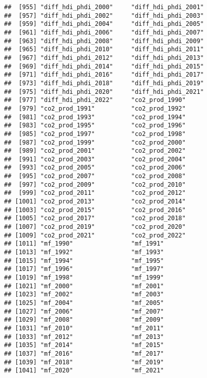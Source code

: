 \documentclass[
]{article}
\begin{document}
\begin{verbatim}
##  [955] "diff_hdi_phdi_2000"     "diff_hdi_phdi_2001"    
##  [957] "diff_hdi_phdi_2002"     "diff_hdi_phdi_2003"    
##  [959] "diff_hdi_phdi_2004"     "diff_hdi_phdi_2005"    
##  [961] "diff_hdi_phdi_2006"     "diff_hdi_phdi_2007"    
##  [963] "diff_hdi_phdi_2008"     "diff_hdi_phdi_2009"    
##  [965] "diff_hdi_phdi_2010"     "diff_hdi_phdi_2011"    
##  [967] "diff_hdi_phdi_2012"     "diff_hdi_phdi_2013"    
##  [969] "diff_hdi_phdi_2014"     "diff_hdi_phdi_2015"    
##  [971] "diff_hdi_phdi_2016"     "diff_hdi_phdi_2017"    
##  [973] "diff_hdi_phdi_2018"     "diff_hdi_phdi_2019"    
##  [975] "diff_hdi_phdi_2020"     "diff_hdi_phdi_2021"    
##  [977] "diff_hdi_phdi_2022"     "co2_prod_1990"         
##  [979] "co2_prod_1991"          "co2_prod_1992"         
##  [981] "co2_prod_1993"          "co2_prod_1994"         
##  [983] "co2_prod_1995"          "co2_prod_1996"         
##  [985] "co2_prod_1997"          "co2_prod_1998"         
##  [987] "co2_prod_1999"          "co2_prod_2000"         
##  [989] "co2_prod_2001"          "co2_prod_2002"         
##  [991] "co2_prod_2003"          "co2_prod_2004"         
##  [993] "co2_prod_2005"          "co2_prod_2006"         
##  [995] "co2_prod_2007"          "co2_prod_2008"         
##  [997] "co2_prod_2009"          "co2_prod_2010"         
##  [999] "co2_prod_2011"          "co2_prod_2012"         
## [1001] "co2_prod_2013"          "co2_prod_2014"         
## [1003] "co2_prod_2015"          "co2_prod_2016"         
## [1005] "co2_prod_2017"          "co2_prod_2018"         
## [1007] "co2_prod_2019"          "co2_prod_2020"         
## [1009] "co2_prod_2021"          "co2_prod_2022"         
## [1011] "mf_1990"                "mf_1991"               
## [1013] "mf_1992"                "mf_1993"               
## [1015] "mf_1994"                "mf_1995"               
## [1017] "mf_1996"                "mf_1997"               
## [1019] "mf_1998"                "mf_1999"               
## [1021] "mf_2000"                "mf_2001"               
## [1023] "mf_2002"                "mf_2003"               
## [1025] "mf_2004"                "mf_2005"               
## [1027] "mf_2006"                "mf_2007"               
## [1029] "mf_2008"                "mf_2009"               
## [1031] "mf_2010"                "mf_2011"               
## [1033] "mf_2012"                "mf_2013"               
## [1035] "mf_2014"                "mf_2015"               
## [1037] "mf_2016"                "mf_2017"               
## [1039] "mf_2018"                "mf_2019"               
## [1041] "mf_2020"                "mf_2021"               

\end{verbatim}
\end{document}
